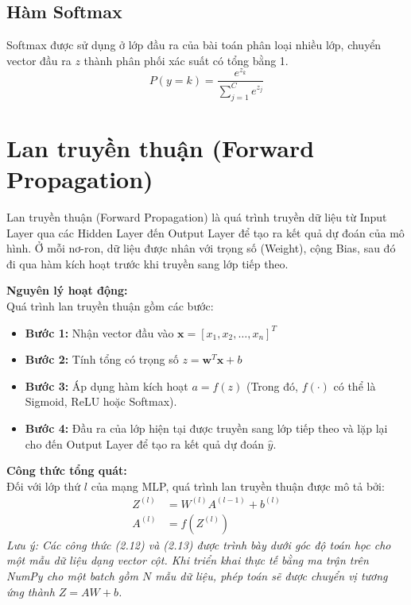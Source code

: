 \documentclass[12pt,a4paper]{report}
\begin{document}
\subsection{Hàm Softmax}
Softmax được sử dụng ở lớp đầu ra của bài toán phân loại nhiều lớp, chuyển vector đầu ra $z$ thành phân phối xác suất có tổng bằng 1.
\begin{equation}
    P(y=k) = \frac{e^{z_k}}{\sum_{j=1}^C e^{z_j}}
\end{equation}

\section{Lan truyền thuận (Forward Propagation)}
Lan truyền thuận (Forward Propagation) là quá trình truyền dữ liệu từ Input Layer qua các Hidden Layer đến Output Layer để tạo ra kết quả dự đoán của mô hình. Ở mỗi nơ-ron, dữ liệu được nhân với trọng số (Weight), cộng Bias, sau đó đi qua hàm kích hoạt trước khi truyền sang lớp tiếp theo.

\textbf{Nguyên lý hoạt động:} \\
Quá trình lan truyền thuận gồm các bước:
\begin{itemize}
    \item \textbf{Bước 1:} Nhận vector đầu vào $\mathbf{x} = [x_1, x_2, \dots, x_n]^T$
    \item \textbf{Bước 2:} Tính tổng có trọng số $z = \mathbf{w}^T \mathbf{x} + b$
    \item \textbf{Bước 3:} Áp dụng hàm kích hoạt $a = f(z)$ (Trong đó, $f(\cdot)$ có thể là Sigmoid, ReLU hoặc Softmax).
    \item \textbf{Bước 4:} Đầu ra của lớp hiện tại được truyền sang lớp tiếp theo và lặp lại cho đến Output Layer để tạo ra kết quả dự đoán $\hat{y}$.
\end{itemize}

\textbf{Công thức tổng quát:} \\
Đối với lớp thứ $l$ của mạng MLP, quá trình lan truyền thuận được mô tả bởi:
\begin{align}
    Z^{(l)} &= W^{(l)} A^{(l-1)} + b^{(l)} \\
    A^{(l)} &= f\left(Z^{(l)}\right)
\end{align}
\textit{Lưu ý: Các công thức (2.12) và (2.13) được trình bày dưới góc độ toán học cho một mẫu dữ liệu dạng vector cột. Khi triển khai thực tế bằng ma trận trên NumPy cho một batch gồm $N$ mẫu dữ liệu, phép toán sẽ được chuyển vị tương ứng thành $Z = A W + b$.}
\end{document}
